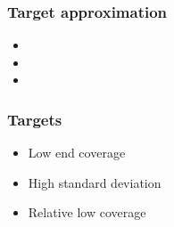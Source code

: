 \begin{frame}
	\frametitle{Target approximation}
	
	\begin{itemize}
		\item 
		\item 
		\item 
	\end{itemize}
	
\end{frame}

\begin{frame}
	\frametitle{Targets}
	
	\begin{itemize}
		\item Low end coverage
		\item High standard deviation
		\item Relative low coverage
	\end{itemize}
	
\end{frame}